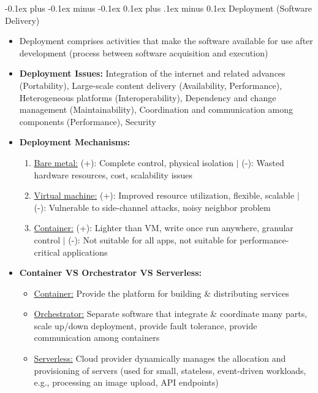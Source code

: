 \documentclass[landscape]{article}
\makeatletter
\renewcommand{\subsection}{\@startsection{subsection}{2}{0mm}%
  {-0.1ex plus -0.1ex minus -0.1ex}%
  {0.1ex plus .1ex minus 0.1ex}%
{\normalfont\scriptsize\bfseries}}
\makeatother
\begin{document}
\begin{multicols*}{5}
    \subsection{Deployment (Software Delivery)}
    \begin{itemize}
      \item Deployment comprises activities that make the software available for use after development (process between software acquisition and execution)
      \item \textbf{Deployment Issues:} Integration of the internet and related advances (Portability), Large-scale content delivery (Availability, Performance), Heterogeneous platforms (Interoperability), Dependency and change management (Maintainability), Coordination and communication among components (Performance), Security
      \item \textbf{Deployment Mechanisms:}
      \begin{enumerate}
        \item \underline{Bare metal:} (+): Complete control, physical isolation $|$ (-): Wasted hardware resources, cost, scalability issues
        \item \underline{Virtual machine:} (+): Improved resource utilization, flexible, scalable $|$ (-): Vulnerable to side-channel attacks, noisy neighbor problem
        \item \underline{Container:} (+): Lighter than VM, write once run anywhere, granular control $|$ (-): Not suitable for all apps, not suitable for performance-critical applications
      \end{enumerate}
      \item \textbf{Container VS Orchestrator VS Serverless:}
      \begin{itemize}
        \item \underline{Container:} Provide the platform for building \& distributing services
        \item \underline{Orchestrator:} Separate software that integrate \& coordinate many parts, scale up/down deployment, provide fault tolerance, provide communication among containers
        \item \underline{Serverless:} Cloud provider dynamically manages the allocation and provisioning of servers (used for small, stateless, event-driven workloads, e.g., processing an image upload, API endpoints)
      \end{itemize}
    \end{itemize}


\end{multicols*}
\end{document}
